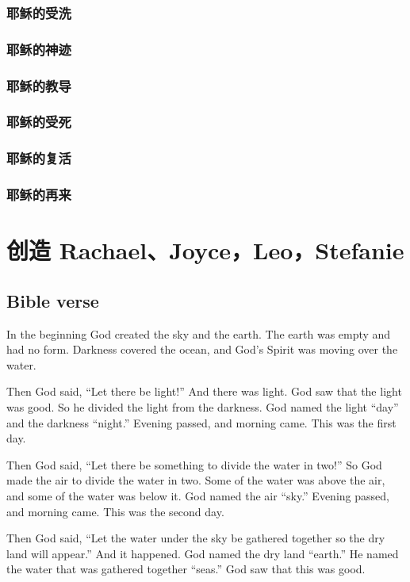 \subsection{耶稣的受洗}
\subsection{耶稣的神迹}
\subsection{耶稣的教导}
\subsection{耶稣的受死}
\subsection{耶稣的复活}
\subsection{耶稣的再来}
\fi


\chapter{创造 Rachael、Joyce，Leo，Stefanie}
\section{Bible verse}
In the beginning God created the sky and the earth. The earth was empty and had no form. Darkness covered the ocean, and God’s Spirit was moving over the water.

Then God said, “Let there be light!” And there was light. God saw that the light was good. So he divided the light from the darkness. God named the light “day” and the darkness “night.” Evening passed, and morning came. This was the first day.

Then God said, “Let there be something to divide the water in two!” So God made the air to divide the water in two. Some of the water was above the air, and some of the water was below it. God named the air “sky.” Evening passed, and morning came. This was the second day.

Then God said, “Let the water under the sky be gathered together so the dry land will appear.” And it happened. God named the dry land “earth.” He named the water that was gathered together “seas.” God saw that this was good.

